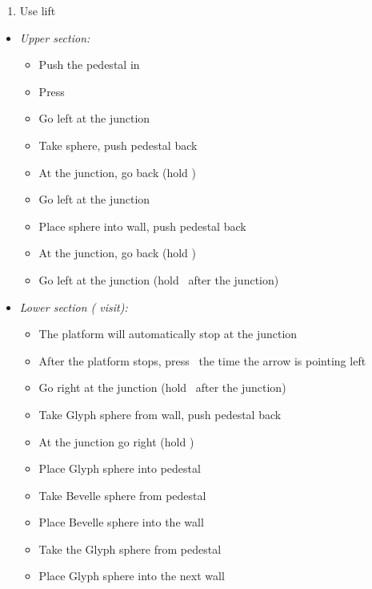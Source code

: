 \begin{enumerate}[resume]
    \item Use lift
\end{enumerate}
\begin{trial}
    \begin{itemize}
        \item \textit{Upper section:}
        \begin{itemize}
            \item Push the pedestal in
            \item Press \Confirm
            \item Go left at the  junction
            \item Take sphere, push pedestal back
            \item At the  junction, go back (hold \Confirm)
            \item Go left at the  junction
            \item Place sphere into wall, push pedestal back
            \item At the  junction, go back (hold \Confirm)
            \item Go left at the  junction (hold \Confirm\ after the  junction)
        \end{itemize}
        \item \textit{Lower section ( visit):}
        \begin{itemize}
            \item The platform will automatically stop at the  junction
            \item After the platform stops, press \Confirm\ the  time the arrow is pointing left
            \item Go right at the  junction (hold \Confirm\ after the  junction)
            \item Take Glyph sphere from wall, push pedestal back
            \item At the  junction go right (hold \Confirm)
            \item Place Glyph sphere into pedestal
            \item Take Bevelle sphere from pedestal
            \item Place Bevelle sphere into the wall
            \item Take the Glyph sphere from pedestal
            \item Place Glyph sphere into the next wall

\end{itemize}
\end{itemize}
\end{trial}
